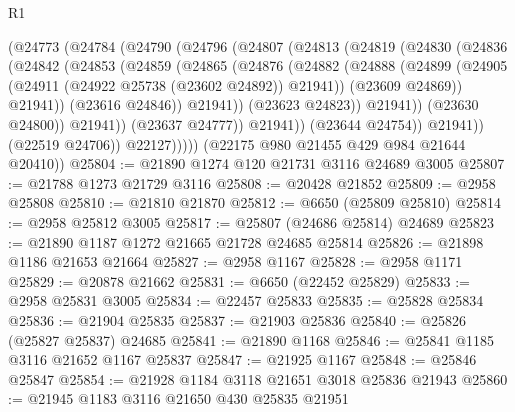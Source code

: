 \begin{lexlean}{R1}
\begin{coremodule}
                    (@24773
                      (@24784
                        (@24790
                          (@24796
                            (@24807
                              (@24813
                                (@24819
                                  (@24830
                                    (@24836
                                      (@24842
                                        (@24853
                                          (@24859
                                            (@24865
                                              (@24876
                                                (@24882
                                                  (@24888
                                                    (@24899
                                                      (@24905
                                                        (@24911
                                                          (@24922 @25738 (@23602 @24892))
                                                          @21941))
                                                      (@23609 @24869))
                                                    @21941))
                                                (@23616 @24846))
                                              @21941))
                                          (@23623 @24823))
                                        @21941))
                                    (@23630 @24800))
                                  @21941))
                              (@23637 @24777))
                            @21941))
                        (@23644 @24754))
                      @21941))
                  (@22519 @24706))
                @22127)))))
      (@22175 @980 @21455 @429 @984 @21644 @20410))
@25804 := @21890 @1274 @120 @21731 @3116 @24689 @3005
@25807 := @21788 @1273 @21729 @3116
@25808 := @20428 @21852
@25809 := @2958 @25808
@25810 := @21810 @21870
@25812 := @6650 (@25809 @25810)
@25814 := @2958 @25812 @3005
@25817 := @25807 (@24686 @25814) @24689
@25823 := @21890 @1187 @1272 @21665 @21728 @24685 @25814
@25826 := @21898 @1186 @21653 @21664
@25827 := @2958 @1167
@25828 := @2958 @1171
@25829 := @20878 @21662
@25831 := @6650 (@22452 @25829)
@25833 := @2958 @25831 @3005
@25834 := @22457 @25833
@25835 := @25828 @25834
@25836 := @21904 @25835
@25837 := @21903 @25836
@25840 := @25826 (@25827 @25837) @24685
@25841 := @21890 @1168
@25846 := @25841 @1185 @3116 @21652 @1167 @25837
@25847 := @21925 @1167
@25848 := @25846 @25847
@25854 := @21928 @1184 @3118 @21651 @3018 @25836 @21943
@25860 := @21945 @1183 @3116 @21650 @430 @25835 @21951

\end{coremodule}
\end{lexlean}
